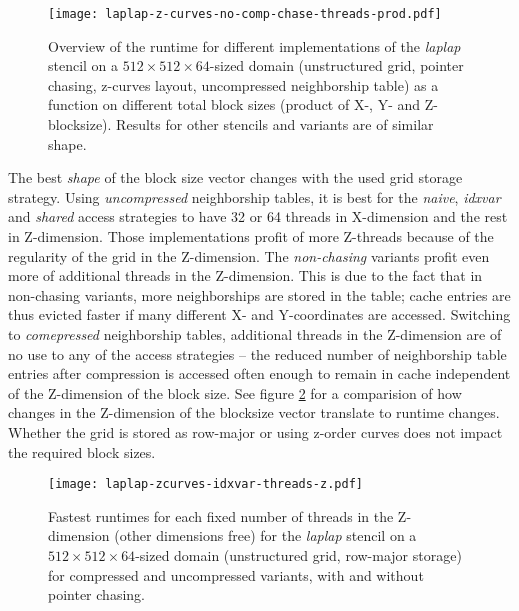 \begin{figure}
	\texttt{[image: laplap-z-curves-no-comp-chase-threads-prod.pdf]}
	\caption{\label{fig:blocksizes-overview} Overview of the runtime for different implementations of the \emph{laplap} stencil on a $512\times 512\times 64$-sized domain (unstructured grid, pointer chasing, z-curves layout, uncompressed neighborship table) as a function on different total block sizes (product of X-, Y- and Z-blocksize). Results for other stencils and variants are of similar shape.}
\end{figure}

The best \emph{shape} of the block size vector changes with the used grid storage strategy. Using \emph{uncompressed} neighborship tables, it is best for the \emph{naive}, \emph{idxvar} and \emph{shared} access strategies to have 32 or 64 threads in X-dimension and the rest in Z-dimension. Those implementations profit of more Z-threads because of the regularity of the grid in the Z-dimension. The \emph{non-chasing} variants profit even more of additional threads in the Z-dimension. This is due to the fact that in non-chasing variants, more neighborships are stored in the table; cache entries are thus evicted faster if many different X- and Y-coordinates are accessed. Switching to \emph{comepressed} neighborship tables, additional threads in the Z-dimension are of no use to any of the access strategies -- the reduced number of neighborship table entries after compression is accessed often enough to remain in cache independent of the Z-dimension of the block size. See figure \ref{fig:blocksizes-z} for a comparision of how changes in the Z-dimension of the blocksize vector translate to runtime changes. Whether the grid is stored as row-major or using z-order curves does not impact the required block sizes.

\begin{figure}
	\texttt{[image: laplap-zcurves-idxvar-threads-z.pdf]} %
	\caption{\label{fig:blocksizes-z}Fastest runtimes for each fixed number of threads in the Z-dimension (other dimensions free) for the \emph{laplap} stencil on a $512\times 512\times 64$-sized domain (unstructured grid, row-major storage) for compressed and uncompressed variants, with and without pointer chasing.}
\end{figure}

